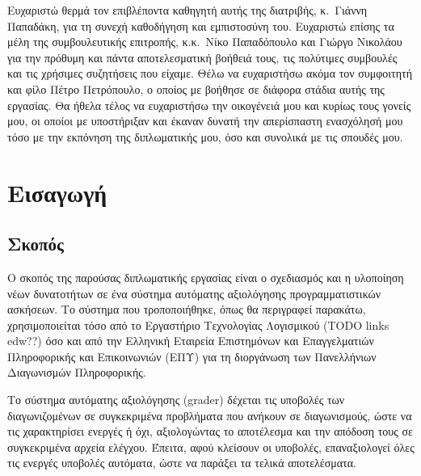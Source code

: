 \documentclass[diploma]{softlab-thesis}
\begin{document}

\begin{acknowledgementsgr}
Ευχαριστώ θερμά τον επιβλέποντα καθηγητή αυτής της διατριβής,
κ.~Γιάννη Παπαδάκη, για τη συνεχή καθοδήγηση και εμπιστοσύνη
του. Ευχαριστώ επίσης τα μέλη της συμβουλευτικής επιτροπής,
κ.κ.~Νίκο Παπαδόπουλο και Γιώργο Νικολάου για την πρόθυμη και
πάντα αποτελεσματική βοήθειά τους, τις πολύτιμες συμβουλές και
τις χρήσιμες συζητήσεις που είχαμε. Θέλω να ευχαριστήσω ακόμα
τον συμφοιτητή και φίλο Πέτρο Πετρόπουλο, ο οποίος με βοήθησε σε
διάφορα στάδια αυτής της εργασίας. Θα ήθελα τέλος να ευχαριστήσω
την οικογένειά μου και κυρίως τους γονείς μου, οι οποίοι με
υποστήριξαν και έκαναν δυνατή την απερίσπαστη ενασχόλησή μου τόσο
με την εκπόνηση της διπλωματικής μου, όσο και συνολικά με τις
σπουδές μου.
\end{acknowledgementsgr}



\tableofcontents
\listoftables
\listoffigures



\mainmatter

\chapter{Εισαγωγή}

\section{Σκοπός}

Ο σκοπός της παρούσας διπλωματικής εργασίας είναι ο σχεδιασμός
και η υλοποίηση νέων δυνατοτήτων σε ένα σύστημα αυτόματης αξιολόγησης
προγραμματιστικών ασκήσεων. Το σύστημα που τροποποιήθηκε, όπως θα περιγραφεί
παρακάτω, χρησιμοποιείται τόσο από το Εργαστήριο Τεχνολογίας Λογισμικού (ΤODO links edw??)
όσο και από την Ελληνική Εταιρεία Επιστημόνων και Επαγγελματιών Πληροφορικής
και Επικοινωνιών (ΕΠΥ) για τη διοργάνωση των Πανελλήνιων Διαγωνισμών Πληροφορικής.

\bigskip

Το σύστημα αυτόματης αξιολόγησης (grader) δέχεται τις υποβολές των
διαγωνιζομένων σε συγκεκριμένα προβλήματα που ανήκουν σε διαγωνισμούς,
ώστε να τις χαρακτηρίσει ενεργές ή όχι, αξιολογώντας
το αποτέλεσμα και την απόδοση τους σε συγκεκριμένα αρχεία ελέγχου.
Έπειτα, αφού κλείσουν οι υποβολές, επαναξιολογεί όλες τις ενεργές
υποβολές αυτόματα, ώστε να παράξει τα τελικά αποτελέσματα.
\end{document}
